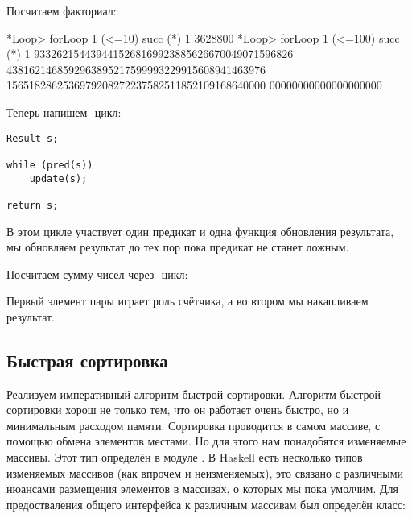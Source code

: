 Посчитаем факториал:

\begin{code}
*Loop> forLoop 1 (<=10) succ (*) 1
3628800
*Loop> forLoop 1 (<=100) succ (*) 1
9332621544394415268169923885626670049071596826
4381621468592963895217599993229915608941463976
1565182862536979208272237582511852109168640000
00000000000000000000
\end{code}

Теперь напишем -цикл:

\begin{verbatim}
Result s;

while (pred(s))
    update(s);

return s;
\end{verbatim}

В этом цикле участвует один предикат и одна функция обновления
результата, мы обновляем результат до тех пор пока предикат
не станет ложным.


Посчитаем сумму чисел через -цикл:


Первый элемент пары играет роль счётчика, а во 
втором мы накапливаем результат.

\subsection{Быстрая сортировка}

Реализуем императивный алгоритм быстрой сортировки.
Алгоритм быстрой сортировки хорош не только тем, что
он работает очень быстро, но и минимальным расходом памяти.
Сортировка проводится в самом массиве, с помощью 
обмена элементов местами. Но для этого нам понадобятся 
изменяемые массивы. Этот тип определён в модуле
. В Haskell есть несколько типов
изменяемых массивов (как впрочем и неизменяемых),
это связано с различными нюансами размещения элементов
в массивах, о которых мы пока умолчим. Для предостваления
общего интерфейса к различным массивам был определён класс:

